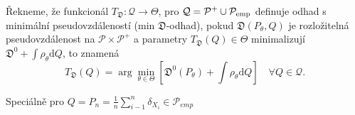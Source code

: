 \begin{definition}
	Řekneme, že funkcionál $T_\mathfrak{D}:\mathcal{Q} \rightarrow \Theta$, pro $\mathcal{Q}=\mathcal{P}^+ \cup \mathcal{P}_\mathrm{emp}$	definuje odhad s minimální pseudovzdáleností (min $\mathfrak{D}$-odhad), pokud  $\mathfrak{D}(P_\theta,Q)$ je rozložitelná pseudovzdálenost na $\mathcal{P}\times\mathcal{P}^+$ a parametry  $T_\mathfrak{D}(Q) \in \Theta$ minimalizují $\mathfrak{D}^0 + \int{\rho_\theta}\mathrm{d}Q$, to znamená
	\begin{equation}
		T_\mathfrak{D}(Q) = \arg\min_{\theta \in \Theta} \left[ \mathfrak{D}^0(P_\theta) + \int{\rho_\theta}\mathrm{d}Q \right] \quad \forall Q \in \mathcal{Q}.
	\end{equation}
\end{definition}
Speciálně pro $Q = P_n = \frac{1}{n}\sum_{i-1}^n \delta_{X_i} \in \mathcal{P}_{emp}$

